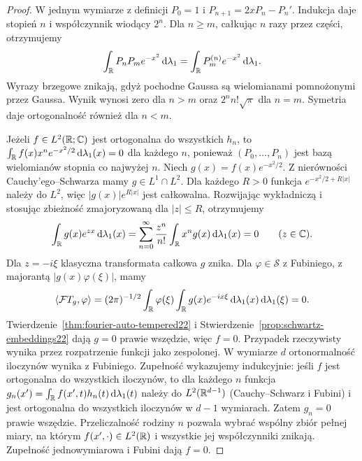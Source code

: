 \begin{proof}
W jednym wymiarze z definicji $P_0=1$ i $P_{n+1}=2xP_n-P_n'$.
Indukcja daje stopień $n$ i współczynnik wiodący $2^n$.
Dla $n\ge m$, całkując $n$ razy przez części, otrzymujemy
\[
 \int_\mathbb R P_nP_m e^{-x^2}\,\mathrm d\lambda_1
 =\int_\mathbb R P_m^{(n)}e^{-x^2}\,\mathrm d\lambda_1.
\]
Wyrazy brzegowe znikają, gdyż pochodne Gaussa są
wielomianami pomnożonymi przez Gaussa. Wynik wynosi zero
dla $n>m$ oraz $2^n n!\sqrt\pi$ dla $n=m$.
Symetria daje ortogonalność również dla $n<m$.

Jeżeli $f\in L^2(\mathbb R;\mathbb C)$ jest ortogonalna do wszystkich
$h_n$, to $\int_\mathbb R f(x)x^n e^{-x^2/2}\,\mathrm d\lambda_1(x)=0$
dla każdego $n$, ponieważ $(P_0,\ldots,P_n)$ jest bazą
wielomianów stopnia co najwyżej $n$. Niech $g(x)=f(x)e^{-x^2/2}$.
Z nierówności Cauchy'ego--Schwarza mamy $g\in L^1\cap L^2$.
Dla każdego $R>0$ funkcja $e^{-x^2/2+R|x|}$ należy do $L^2$,
więc $|g(x)|e^{R|x|}$ jest całkowalna.
Rozwijając wykładniczą i stosując zbieżność zmajoryzowaną
dla $|z|\le R$, otrzymujemy
\[
 \int_\mathbb R g(x)e^{zx}\,\mathrm d\lambda_1(x)
 =\sum_{n=0}^\infty\frac{z^n}{n!}
 \int_\mathbb R x^ng(x)\,\mathrm d\lambda_1(x)=0
 \qquad(z\in\mathbb C).
\]
Dla $z=-i\xi$ klasyczna transformata całkowa $g$ znika.
Dla $\varphi\in\mathcal S$ z Fubiniego, z majorantą
$|g(x)\varphi(\xi)|$, mamy
\[
 \langle\mathcal F T_g,\varphi\rangle
 =(2\pi)^{-1/2}\int_\mathbb R\varphi(\xi)
 \int_\mathbb R g(x)e^{-ix\xi}\,\mathrm d\lambda_1(x)
 \,\mathrm d\lambda_1(\xi)=0.
\]
Twierdzenie~\ref{thm:fourier-auto-tempered22} i
Stwierdzenie~\ref{prop:schwartz-embeddings22} dają
$g=0$ prawie wszędzie, więc $f=0$. Przypadek rzeczywisty
wynika przez rozpatrzenie funkcji jako zespolonej.
W wymiarze $d$ ortonormalność iloczynów wynika z Fubiniego.
Zupełność wykazujemy indukcyjnie: jeśli $f$ jest
ortogonalna do wszystkich iloczynów, to dla każdego $n$
funkcja $g_n(x')=\int_\mathbb R f(x',t)h_n(t)\,\mathrm d\lambda_1(t)$
należy do $L^2(\mathbb R^{d-1})$ (Cauchy--Schwarz i Fubini)
i jest ortogonalna do wszystkich iloczynów w $d-1$
wymiarach. Zatem $g_n=0$ prawie wszędzie.
Przeliczalność rodziny $n$ pozwala wybrać wspólny zbiór
pełnej miary, na którym $f(x',\cdot)\in L^2(\mathbb R)$ i
wszystkie jej współczynniki znikają. Zupełność
jednowymiarowa i Fubini dają $f=0$.


\end{proof}
